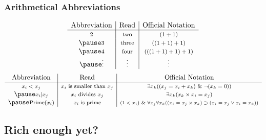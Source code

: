 \begin{frame}
\frametitle{Arithmetical Abbreviations}


\[
\begin{array}{c|c|c}
\text{{Abbreviation}}  & \text{{Read}} & \text{{Official Notation}}     \\
\hline
\text{\footnotesize  $2$} & \text{\footnotesize two} & \text{\footnotesize $(1+1)$}   \\ \pause 
\text{\footnotesize  $3$} & \text{\footnotesize three} & \text{\footnotesize $((1+1) +1)$}  \\ \pause 
\text{\footnotesize $4$} & \text{\footnotesize four} & \text{\footnotesize $(((1+1) +1) + 1)$}   \\  \pause 
\text{\footnotesize \vdots} & \text{\footnotesize \vdots} & \text{\footnotesize \vdots} \\
\end{array}
\]
 \pause 
\[
\begin{array}{c|c|c}
 \text{{Abbreviation}}  &\text{{Read}} &\text{{Official Notation}}   \\
\hline
\text{\footnotesize $x_i < x_j$}  & \text{\footnotesize  $x_i$ is smaller than $x_j$}  & \text{\footnotesize  \(\exists x_k( (x_j = x_i + x_k) \ \& \ \neg(x_k = 0))\)}\\ \pause 
\text{\footnotesize $x_i |  x_j$}  & \text{\footnotesize  $x_i$ divides $x_j$}  & \text{\footnotesize  \(\exists x_k (x_k \times x_i = x_j)\)}\\ \pause 
\text{\footnotesize $\text{Prime}(x_i)$}  & \text{\footnotesize  $x_i$ is prime}  & \text{\scriptsize  \((1< x_i) \ \&\ \forall x_j\forall x_k((x_i = x_j\times x_k)\supset(x_i=x_j\vee x_i=x_k))\)}\\
\end{array}
\]

\end{frame}

\subsection{Rich enough yet?}

